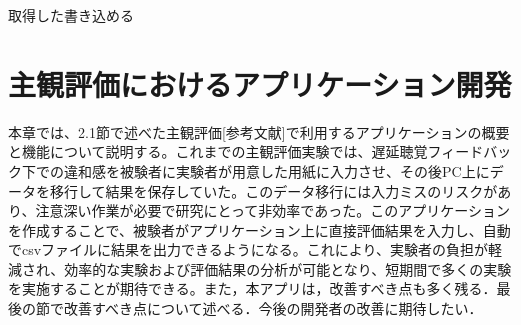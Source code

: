 取得した書き込める\chapter{主観評価におけるアプリケーション開発}
本章では、2.1節で述べた主観評価[参考文献]で利用するアプリケーションの概要と機能について説明する。これまでの主観評価実験では、遅延聴覚フィードバック下での違和感を被験者に実験者が用意した用紙に入力させ、その後PC上にデータを移行して結果を保存していた。このデータ移行には入力ミスのリスクがあり、注意深い作業が必要で研究にとって非効率であった。このアプリケーションを作成することで、被験者がアプリケーション上に直接評価結果を入力し、自動でcsvファイルに結果を出力できるようになる。これにより、実験者の負担が軽減され、効率的な実験および評価結果の分析が可能となり、短期間で多くの実験を実施することが期待できる。また，本アプリは，改善すべき点も多く残る．最後の節で改善すべき点について述べる．今後の開発者の改善に期待したい．
